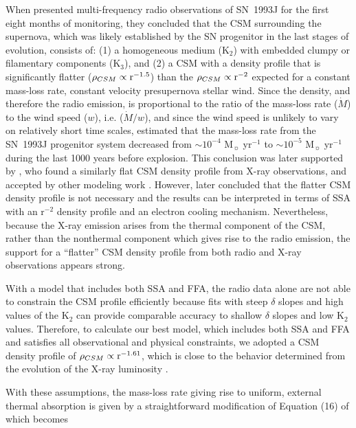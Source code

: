 \documentclass[12pt,preprint]{aastex}
\begin{document}
When \citet{VanDyk94} presented multi-frequency radio observations of SN~1993J for the first eight months of monitoring, they concluded that the CSM surrounding the supernova, which was likely established by the SN
progenitor in the last stages of evolution, consists of: (1) a homogeneous medium (K$_2$) with embedded clumpy or filamentary components (K$_3$), and (2) a CSM with a density profile that is significantly flatter ($\rho_{CSM} \propto {\rm r}^{-1.5}$) than the $\rho_{CSM} \propto {\rm r}^{-2}$ expected for a constant mass-loss rate, constant velocity presupernova stellar wind.  Since the density, and therefore the radio emission, is proportional to the ratio of the mass-loss rate ($\dot M$) to the wind speed ($w$), i.e. ($\dot M/w$), and since the wind speed is unlikely to vary on relatively short time scales, \citet{VanDyk94} estimated that the mass-loss rate from the SN~1993J progenitor system decreased from $\sim 10^{-4}$ M$_{\sun}$ yr$^{-1}$ to $\sim 10^{-5}$ M$_{\sun}$ yr$^{-1}$ during the last 1000 years before explosion.  This conclusion was later supported by \cite{Immler01}, who found a similarly flat CSM density profile from X-ray observations, and accepted by other modeling work \citep{Fransson96}. However, \cite{Fransson98} later concluded that the flatter CSM density profile is not necessary and the results can be interpreted in terms of SSA with an r$^{-2}$ density profile and an electron cooling mechanism. Nevertheless, because the X-ray emission arises from the thermal component of the CSM, rather than the nonthermal component which gives rise to the radio emission, the support for a ``flatter'' CSM density profile from both radio and X-ray observations appears strong.

With a model that includes both SSA and FFA, the radio data alone are not able to constrain the CSM profile efficiently because fits with steep $\delta$ slopes and high values of the K$_2$ can provide comparable accuracy to shallow $\delta$ slopes and low K$_2$ values. Therefore, to calculate our best model, which includes both SSA and FFA and satisfies all observational and physical constraints, we adopted a CSM density profile of $\rho_{CSM} \propto {\rm r}^{-1.61}$, which is close to the behavior determined from the evolution of the X-ray luminosity \citep[][see also $\S$ \ref{Radio-X-Ray}]{Immler01,Zimmermann03}. 

With these assumptions, the mass-loss rate giving rise to uniform, external thermal absorption is given by a straightforward modification of Equation (16) of \citet{Weiler86} which becomes
\end{document}
